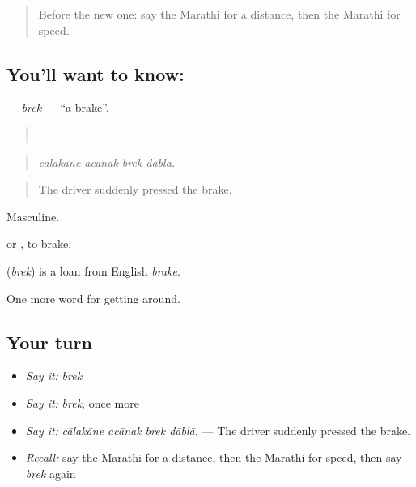 \label{lesson:MR-C407-brek}



\begin{quote}
Before the new one: say the Marathi for a distance, then the Marathi for speed.
\end{quote}

\subsection*{You'll want to know: }
\textbf{} — \emph{brek} — \textquotedblleft{}a brake\textquotedblright{}.

\begin{quote}
   .
\end{quote}

\begin{quote}
\emph{cālakāne acānak brek dāblā.}
\end{quote}

\begin{quote}
The driver suddenly pressed the brake.
\end{quote}

Masculine.

  or  , to brake.

\begin{cousinweb}
\textbf{} (\emph{brek}) is a loan from English \emph{brake}.
\end{cousinweb}

\begin{grammarlens}[title={What you've built}]
One more word for getting around.
\end{grammarlens}

\subsection*{Your turn}
\begin{itemize}
\raggedright
  \item \emph{Say it:} \emph{brek}
  \item \emph{Say it:} \emph{brek}, once more
  \item \emph{Say it:} \emph{cālakāne acānak brek dāblā.} — The driver suddenly pressed the brake.
  \item \emph{Recall:} say the Marathi for a distance, then the Marathi for speed, then say \emph{brek} again
\end{itemize}

